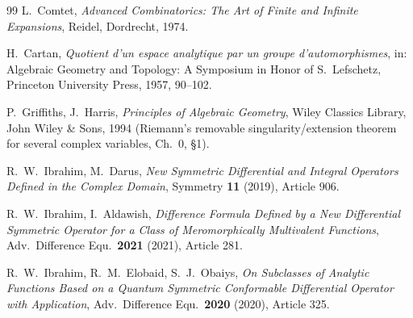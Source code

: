 \documentclass[10pt,a4paper]{amsart}
\begin{document}
\begin{thebibliography}{99}
 L.\ Comtet, \emph{Advanced Combinatorics: The Art of Finite and Infinite Expansions}, Reidel, Dordrecht, 1974.

 H.\ Cartan, \emph{Quotient d'un espace analytique par un groupe d'automorphismes}, in: Algebraic Geometry and Topology: A Symposium in Honor of S.\ Lefschetz, Princeton University Press, 1957, 90--102.

 P.\ Griffiths, J.\ Harris, \emph{Principles of Algebraic Geometry}, Wiley Classics Library, John Wiley \& Sons, 1994 (Riemann's removable singularity/extension theorem for several complex variables, Ch.~0, \S1).

 R.\ W.\ Ibrahim, M.\ Darus, \emph{New Symmetric Differential and Integral Operators Defined in the Complex Domain}, Symmetry \textbf{11} (2019), Article 906.

 R.\ W.\ Ibrahim, I.\ Aldawish, \emph{Difference Formula Defined by a New Differential Symmetric Operator for a Class of Meromorphically Multivalent Functions}, Adv.\ Difference Equ.\ \textbf{2021} (2021), Article 281.

 R.\ W.\ Ibrahim, R.\ M.\ Elobaid, S.\ J.\ Obaiys, \emph{On Subclasses of Analytic Functions Based on a Quantum Symmetric Conformable Differential Operator with Application}, Adv.\ Difference Equ.\ \textbf{2020} (2020), Article 325.

\end{thebibliography}
\end{document}
